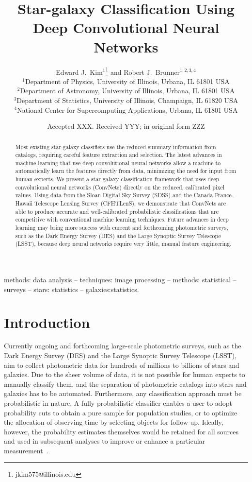\documentclass[fleqn,usenatbib]{mnras}
\title[Star-galaxy Classification Using ConvNets]{Star-galaxy Classification Using Deep Convolutional Neural Networks}
\author[E. J. Kim and R. J. Brunner]{
  Edward J.~Kim$^1$\thanks{jkim575@illinois.edu} and Robert J.~Brunner$^{1,2,3,4}$ \\
$^1$Department of Physics, University of Illinois, Urbana, IL 61801 USA\\
$^2$Department of Astronomy, University of Illinois, Urbana, IL 61801 USA\\
$^3$Department of Statistics, University of Illinois, Champaign, IL 61820 USA\\
$^4$National Center for Supercomputing Applications, Urbana, IL 61801 USA
}
\date{Accepted XXX. Received YYY; in original form ZZZ}
\begin{document}
\label{firstpage}
\pagerange{\pageref{firstpage}--\pageref{lastpage}}
\maketitle

\begin{abstract}
Most existing star-galaxy classifiers use the reduced summary information from catalogs,
requiring careful feature extraction and selection.
The latest advances in machine learning that use deep convolutional neural networks
allow a machine to automatically learn the features directly from data,
minimizing the need for input from human experts.
We present a star-galaxy classification framework that uses
deep convolutional neural networks (ConvNets) directly on the reduced, calibrated pixel values.
Using data from the Sloan Digital Sky Survey (SDSS) and
the Canada-France-Hawaii Telescope Lensing Survey (CFHTLenS),
we demonstrate that ConvNets are able to produce accurate and well-calibrated
probabilistic classifications that are competitive with
conventional machine learning techniques.
Future advances in deep learning may bring more success with current and
forthcoming photometric surveys, such as the Dark Energy Survey (DES) and
the Large Synoptic Survey Telescope (LSST), because deep neural networks require
very little, manual feature engineering.
\end{abstract}

\begin{keywords}
methods: data analysis -- techniques: image processing -- methods: statistical
-- surveys -- stars: statistics -- galaxies:statistics.
\end{keywords}

\section{Introduction}
  \label{sec:introduction}

Currently ongoing and forthcoming large-scale photometric surveys,
such as the Dark Energy Survey (DES) and the Large Synoptic Survey Telescope (LSST),
aim to collect photometric data for hundreds of millions to billions of
stars and galaxies.
Due to the sheer volume of data, it is not possible for human experts to
manually classify them,
and the separation of photometric catalogs into stars and galaxies has to be automated.
Furthermore, any classification approach must be probabilistic in nature.
A fully probabilistic classifier enables a user to adopt probability cuts
to obtain a pure sample for population studies,
or to optimize the allocation of observing time by selecting objects for follow-up.
Ideally, however, the probability estimates themselves would be retained for all sources
and used in subsequent analyses to improve or enhance a particular
measurement~\citep{ross2011ameliorating,seo2012acoustic}.
\end{document}
